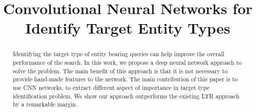 \documentclass[sigconf]{acmart}
\begin{document}
\title{Convolutional Neural Networks for Identify Target Entity Types}


\begin{abstract}
Identifying the target type of entity bearing queries can help improve the overall performance of the search. In this work, we propose a deep neural network approach to solve the problem. The main benefit of this approach is that it is not necessary to provide hand-made features to the network. The main contribution of this paper is to use CNN networks, to extract different aspect of importance in target type identification problem. We show our approach outperforms the existing LTR approach by a remarkable margin.
\end{abstract}

%
%


%


\maketitle



%
%
\end{document}
